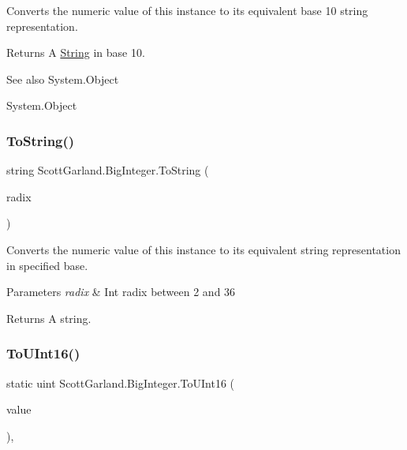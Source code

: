 Converts the numeric value of this instance to its equivalent base 10 string representation. 

\begin{DoxyReturn}{Returns}
A \hyperlink{}{String} in base 10.
\end{DoxyReturn}
\begin{DoxySeeAlso}{See also}
System.\+Object


\end{DoxySeeAlso}
System.\+Object\mbox{\label{class_scott_garland_1_1_big_integer_a975b135a066ddff12cbef21adf338357}} 
\subsubsection{\texorpdfstring{To\+String()}{ToString()}\hspace{0.1cm}{\footnotesize\ttfamily [2/2]}}
{\footnotesize\ttfamily string Scott\+Garland.\+Big\+Integer.\+To\+String (\begin{DoxyParamCaption}\item[{int}]{radix }\end{DoxyParamCaption})\hspace{0.3cm}{\ttfamily [inline]}}



Converts the numeric value of this instance to its equivalent string representation in specified base. 


\begin{DoxyParams}{Parameters}
{\em radix} & Int radix between 2 and 36\\
\hline
\end{DoxyParams}
\begin{DoxyReturn}{Returns}
A string.
\end{DoxyReturn}
\mbox{\label{class_scott_garland_1_1_big_integer_a2a619b20c5463022dd1f6d21b3816a22}} 
\subsubsection{\texorpdfstring{To\+U\+Int16()}{ToUInt16()}}
{\footnotesize\ttfamily static uint Scott\+Garland.\+Big\+Integer.\+To\+U\+Int16 (\begin{DoxyParamCaption}\item[{\hyperlink{class_scott_garland_1_1_big_integer}{Big\+Integer}}]{value }\end{DoxyParamCaption})\hspace{0.3cm}{\ttfamily [inline]}, {\ttfamily [static]}}



